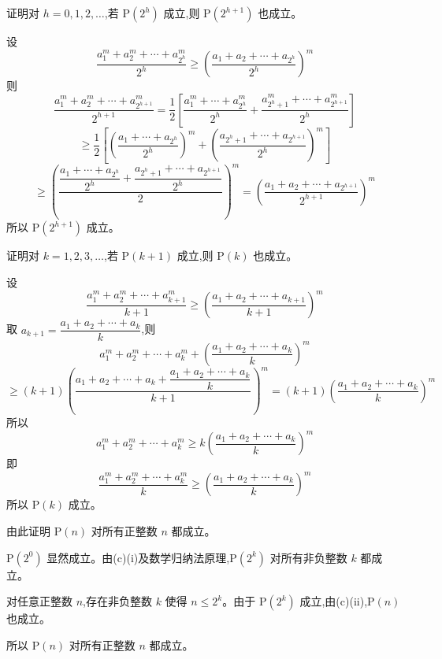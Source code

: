 \begin{questions}
\begin{parts}
\begin{subparts}
\subpart 证明对 $h=0,1,2,\ldots$,若 $\mathrm{P}(2^h)$ 成立,则 $\mathrm{P}(2^{h+1})$ 也成立。

\begin{solution}
设
\[
\frac{a_1^m+a_2^m+\cdots+a_{2^h}^m}{2^h} \ge \left(\frac{a_1+a_2+\cdots+a_{2^h}}{2^h}\right)^m
\]
则
\[
\frac{a_1^m+a_2^m+\cdots+a_{2^{h+1}}^m}{2^{h+1}}
= \frac{1}{2}\left[\frac{a_1^m+\cdots+a_{2^h}^m}{2^h}+\frac{a_{2^h+1}^m+\cdots+a_{2^{h+1}}^m}{2^h}\right]
\]
\[
\ge \frac{1}{2}\left[\left(\frac{a_1+\cdots+a_{2^h}}{2^h}\right)^m+\left(\frac{a_{2^h+1}+\cdots+a_{2^{h+1}}}{2^h}\right)^m\right]
\]
\[
\ge \left(\frac{\dfrac{a_1+\cdots+a_{2^h}}{2^h}+\dfrac{a_{2^h+1}+\cdots+a_{2^{h+1}}}{2^h}}{2}\right)^m
= \left(\frac{a_1+a_2+\cdots+a_{2^{h+1}}}{2^{h+1}}\right)^m
\]
所以 $\mathrm{P}(2^{h+1})$ 成立。
\end{solution}

\subpart 证明对 $k=1,2,3,\ldots$,若 $\mathrm{P}(k+1)$ 成立,则 $\mathrm{P}(k)$ 也成立。

\begin{solution}
设
\[
\frac{a_1^m+a_2^m+\cdots+a_{k+1}^m}{k+1} \ge \left(\frac{a_1+a_2+\cdots+a_{k+1}}{k+1}\right)^m
\]
取 $a_{k+1} = \dfrac{a_1+a_2+\cdots+a_k}{k}$,则
\[
a_1^m+a_2^m+\cdots+a_k^m+\left(\frac{a_1+a_2+\cdots+a_k}{k}\right)^m
\]
\[
\ge \left(k+1\right)\left(\frac{a_1+a_2+\cdots+a_k+\dfrac{a_1+a_2+\cdots+a_k}{k}}{k+1}\right)^m = (k+1)\left(\frac{a_1+a_2+\cdots+a_k}{k}\right)^m
\]
所以
\[
a_1^m+a_2^m+\cdots+a_k^m \ge k\left(\frac{a_1+a_2+\cdots+a_k}{k}\right)^m
\]
即
\[
\frac{a_1^m+a_2^m+\cdots+a_k^m}{k} \ge \left(\frac{a_1+a_2+\cdots+a_k}{k}\right)^m
\]
所以 $\mathrm{P}(k)$ 成立。
\end{solution}

\subpart 由此证明 $\mathrm{P}(n)$ 对所有正整数 $n$ 都成立。

\begin{solution}
$\mathrm{P}(2^0)$ 显然成立。由(c)(i)及数学归纳法原理,$\mathrm{P}(2^k)$ 对所有非负整数 $k$ 都成立。

对任意正整数 $n$,存在非负整数 $k$ 使得 $n\le2^k$。由于 $\mathrm{P}(2^k)$ 成立,由(c)(ii),$\mathrm{P}(n)$ 也成立。

所以 $\mathrm{P}(n)$ 对所有正整数 $n$ 都成立。
\end{solution}
\end{subparts}
\end{parts}

\question
{}
\end{questions}
